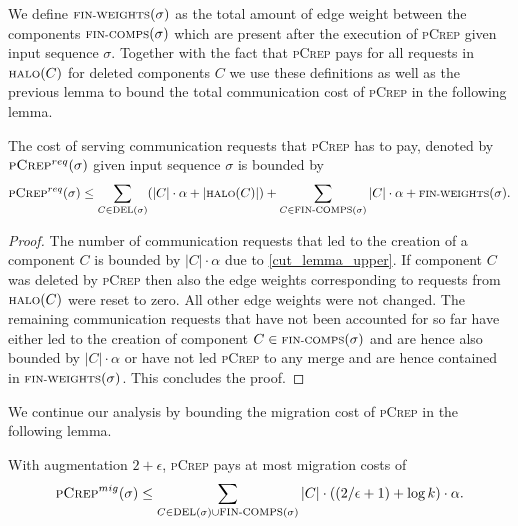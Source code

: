 \documentclass[a4paper,UKenglish,cleveref, autoref, thm-restate,authorcolumns]{lipics-v2019}
\newcommand{\adjDel}{\textsc{pCrep}}
\newcommand{\del}{\text{\scriptsize DEL}}
\newcommand{\halo}{\text{\scriptsize HALO}}
\newcommand{\finalComps}{\text{\scriptsize FIN-COMPS}}
\newcommand{\finalWeights}{\text{\scriptsize FIN-WEIGHTS}}
\begin{document}
We define $\finalWeights{}(\sigma)$ as the total amount of edge weight between the components $\finalComps{}(\sigma)$ which are present after the execution of \adjDel{} given input sequence $\sigma$.
Together with the fact that \adjDel{} pays for all requests in $\halo(C)$ for deleted components $C$ we use these definitions as well as the previous lemma to bound the total communication cost of \adjDel{} in the following lemma.

\begin{lemma}
	\label{crep_req_bound}
	The cost of serving communication requests that \adjDel{} has to pay, denoted by $\adjDel{}^{req}(\sigma)$ given input sequence $\sigma$ is bounded by
	\begin{align*}
	\adjDel{}^{req}(\sigma)\leq\sum_{C\in\del{}(\sigma)}(|C|\cdot\alpha+|\halo(C)|)+\sum_{C\in \finalComps(\sigma)}|C|\cdot\alpha+\finalWeights(\sigma).
	\end{align*}
\end{lemma}

\begin{proof}
	The number of communication requests that led to the creation of a component $C$ is bounded by $|C|\cdot\alpha$ due to \cref{cut_lemma_upper}.
	If component $C$ was deleted by \adjDel{} then also the edge weights corresponding to requests from $\halo(C)$ were reset to zero. All other edge weights were not changed. The remaining communication requests that have not been accounted for so far have either led to the creation of component $C\in\finalComps(\sigma)$ and are hence also bounded by $|C|\cdot\alpha$ or have not led \adjDel{} to any merge and are hence contained in $\finalWeights(\sigma)$. This concludes the proof.
\end{proof}

We continue our analysis by bounding the migration cost of \adjDel{} in the following lemma.

\begin{lemma}
	\label{crep_mig_bound}
	With augmentation $2+\epsilon$, \adjDel{} pays at most migration costs of
	\begin{align*}
	\adjDel^{mig}(\sigma)\leq\sum_{C\in\del{}(\sigma)\cup\finalComps(\sigma)}|C|\cdot((2/\epsilon+1)+\log k)\cdot\alpha.
	\end{align*}
\end{lemma}
\end{document}
